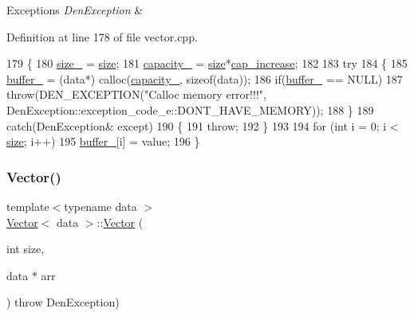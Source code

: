 \begin{DoxyExceptions}{Exceptions}
{\em Den\+Exception} & \\
\hline
\end{DoxyExceptions}


Definition at line 178 of file vector.\+cpp.


\begin{DoxyCode}
179     \{
180         \hyperlink{classVector_a3c70fa478530a90177f2a7e7621ee688}{size\_} = \hyperlink{classVector_a81b1d973485244101caf8e901b4a03d9}{size};
181         \hyperlink{classVector_ad75911bb39018821f0e2911b6905b7ec}{capacity\_} = \hyperlink{classVector_a81b1d973485244101caf8e901b4a03d9}{size}*\hyperlink{classVector_ae612684de42f3ecdefd867b54d232647}{cap\_increase};
182 
183         \textcolor{keywordflow}{try}
184             \{
185                 \hyperlink{classVector_a22db58ae9e92c6014e8ac657804a035a}{buffer\_} = (data*) calloc(\hyperlink{classVector_ad75911bb39018821f0e2911b6905b7ec}{capacity\_}, \textcolor{keyword}{sizeof}(data));
186                 \textcolor{keywordflow}{if}(\hyperlink{classVector_a22db58ae9e92c6014e8ac657804a035a}{buffer\_} == NULL)
187                     \textcolor{keywordflow}{throw}(DEN\_EXCEPTION(\textcolor{stringliteral}{"Calloc memory error!!!"}, 
      DenException::exception\_code\_e::DONT\_HAVE\_MEMORY));
188             \}
189         \textcolor{keywordflow}{catch}(DenException& except)
190             \{
191                 \textcolor{keywordflow}{throw};
192             \}
193 
194         \textcolor{keywordflow}{for} (\textcolor{keywordtype}{int} i = 0; i < \hyperlink{classVector_a81b1d973485244101caf8e901b4a03d9}{size}; i++)
195             \hyperlink{classVector_a22db58ae9e92c6014e8ac657804a035a}{buffer\_}[i] = value;
196     \}
\end{DoxyCode}
\mbox{\label{classVector_a90cdb4e859d9802e381050fa5ef7b1b7}} 
\subsubsection{\texorpdfstring{Vector()}{Vector()}\hspace{0.1cm}{\footnotesize\ttfamily [3/5]}}
{\footnotesize\ttfamily template$<$typename data $>$ \\
\hyperlink{classVector}{Vector}$<$ data $>$\+::\hyperlink{classVector}{Vector} (\begin{DoxyParamCaption}\item[{int}]{size,  }\item[{data $\ast$}]{arr }\end{DoxyParamCaption}) throw  Den\+Exception) }



